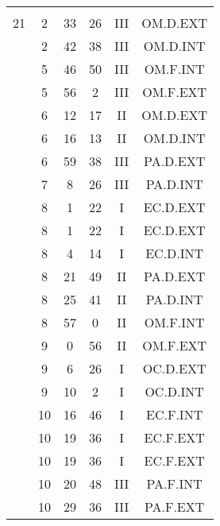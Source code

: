 \documentclass[12pt, a4paper]{article}
\begin{document}
\begin{multicols}{3}
{\begin{tabular}{c c c c c c}
	 	 	 	 & & & & & \\%
	 	 	 	21 & 2 & 33 & 26 & III & OM.D.EXT\\%
	 	 	 	 & 2 & 42 & 38 & III & OM.D.INT\\%
	 	 	 	 & 5 & 46 & 50 & III & OM.F.INT\\%
	 	 	 	 & 5 & 56 & 2 & III & OM.F.EXT\\%
	 	 	 	 & 6 & 12 & 17 & II & OM.D.EXT\\%
	 	 	 	 & 6 & 16 & 13 & II & OM.D.INT\\%
	 	 	 	 & 6 & 59 & 38 & III & PA.D.EXT\\%
	 	 	 	 & 7 & 8 & 26 & III & PA.D.INT\\%
	 	 	 	 & 8 & 1 & 22 & I & EC.D.EXT\\%
	 	 	 	 & 8 & 1 & 22 & I & EC.D.EXT\\%
	 	 	 	 & 8 & 4 & 14 & I & EC.D.INT\\%
	 	 	 	 & 8 & 21 & 49 & II & PA.D.EXT\\%
	 	 	 	 & 8 & 25 & 41 & II & PA.D.INT\\%
	 	 	 	 & 8 & 57 & 0 & II & OM.F.INT\\%
	 	 	 	 & 9 & 0 & 56 & II & OM.F.EXT\\%
	 	 	 	 & 9 & 6 & 26 & I & OC.D.EXT\\%
	 	 	 	 & 9 & 10 & 2 & I & OC.D.INT\\%
	 	 	 	 & 10 & 16 & 46 & I & EC.F.INT\\%
	 	 	 	 & 10 & 19 & 36 & I & EC.F.EXT\\%
	 	 	 	 & 10 & 19 & 36 & I & EC.F.EXT\\%
	 	 	 	 & 10 & 20 & 48 & III & PA.F.INT\\%
	 	 	 	 & 10 & 29 & 36 & III & PA.F.EXT\\%

\end{tabular}}
\end{multicols}
\end{document}
